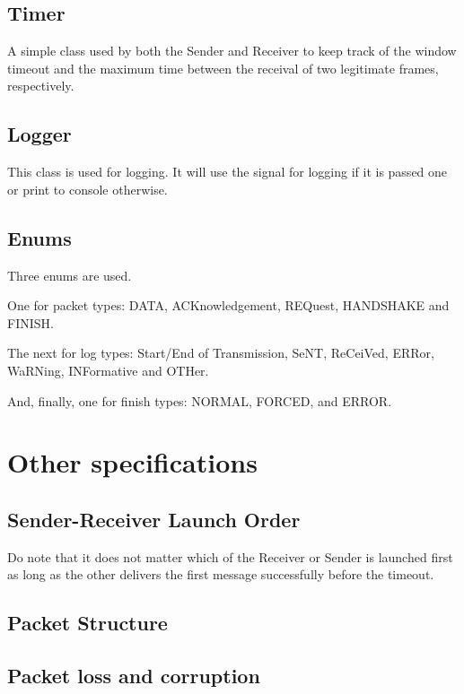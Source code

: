 \documentclass[12pt]{article}
\begin{document}
\subsection{Timer}

A simple class used by both the Sender and Receiver to keep track of the window timeout and the maximum time between the receival of two legitimate frames, respectively.

\subsection{Logger}

This class is used for logging. It will use the signal for logging if it is passed one or print to console otherwise.

\subsection{Enums}

Three enums are used.

One for packet types: DATA, ACKnowledgement, REQuest, HANDSHAKE and FINISH.

The next for log types: Start/End of Transmission, SeNT, ReCeiVed, ERRor, WaRNing, INFormative and OTHer.

And, finally, one for finish types: NORMAL, FORCED, and ERROR.

\section{Other specifications}

\subsection{Sender-Receiver Launch Order}

Do note that it does not matter which of the Receiver or Sender is launched first as long as the other delivers the first message successfully before the timeout.

\subsection{Packet Structure}



\subsection{Packet loss and corruption}
\end{document}
